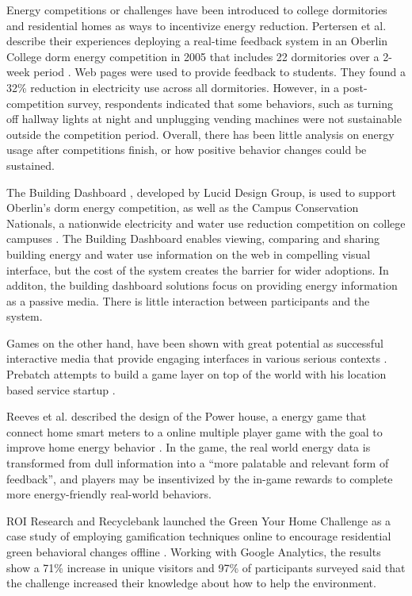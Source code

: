 \documentclass{acm_proc_article-sp}
\begin{document}
Energy competitions or challenges have been introduced to college dormitories 
and residential homes as ways to incentivize energy reduction. Pertersen et 
al. describe their experiences deploying a real-time feedback system in an 
Oberlin College dorm energy competition in 2005 that includes 22 dormitories 
over a 2-week period \cite{petersen-dorm-energy-reduction}. Web pages were used 
to provide feedback to students. They found a 32\% reduction in electricity 
use across all dormitories. However, in a post-competition survey, respondents 
indicated that some behaviors, such as turning off hallway lights at night 
and unplugging vending machines were not sustainable outside the competition 
period.  Overall, there has been little analysis on energy usage after 
competitions finish, or how positive behavior changes could be sustained.

The Building Dashboard \cite{building-dashboard}, developed by Lucid Design 
Group, is used to support Oberlin's dorm energy competition,
as well as the Campus Conservation Nationals, a nationwide electricity and 
water use reduction competition on college campuses \cite{competetoreduce}. 
The Building Dashboard enables viewing, comparing and sharing building energy
and water use information on the web in compelling visual interface, but the 
cost of the system creates the barrier for wider adoptions. In additon, the 
building dashboard solutions focus on providing energy information as 
a passive media. There is little interaction between participants and the system.

Games on the other hand, have been shown with great potential as successful
interactive media that provide engaging interfaces in various serious 
contexts \cite{mcgonigal2011reality,reeves2009total}. Prebatch attempts to build
a game layer on top of the world with his location based service startup
 \cite{Priebatsch2010ted}. 

Reeves et al. described the design of the Power house, 
a energy game that connect home smart meters to a online multiple player game 
with the goal to improve home energy behavior \cite{Reeves2011powerhouse}. 
In the game, the real world energy data is transformed from dull 
information into a ``more palatable and relevant form of feedback'', and players 
may be insentivized by the in-game rewards to complete more energy-friendly 
real-world behaviors. 

ROI Research and Recyclebank launched the Green Your Home Challenge as a case 
study of employing gamification techniques online to 
encourage residential green behavioral changes offline \cite{gamingforgood}. 
Working with Google Analytics, the results show a 71\% increase in unique 
visitors and 97\% of participants surveyed said that the challenge increased 
their knowledge about how to help the environment. 
\end{document}
